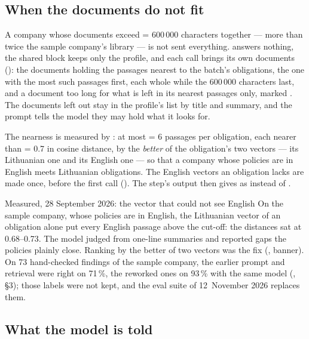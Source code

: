 \subsection{When the documents do not fit}

A company whose documents exceed  = 600\,000 characters together ---
more than twice the sample company's library --- is not sent everything. 
answers nothing, the shared block keeps only the profile, and each call brings its own
documents (): the documents holding the passages nearest to the
batch's obligations, the one with the most such passages first, each whole while the
600\,000 characters last, and a document too long for what is left in its nearest passages
only, marked . The documents left out stay in the profile's list by title
and summary, and the prompt tells the model they may hold what it looks for.

The nearness is measured by : at most  = 6
passages per obligation, each nearer than  = 0.7 in cosine
distance, by the \emph{better} of the obligation's two vectors --- its Lithuanian one and its
English one --- so that a company whose policies are in English meets Lithuanian obligations.
The English vectors an obligation lacks are made once, before the first call
(). The step's output then gives  as  instead of
.

\begin{lessonbox}{Measured, 28 September 2026: the vector that could not see English}
On the sample company, whose policies are in English, the Lithuanian vector of an obligation
alone put every English passage above the cut-off: the distances sat at 0.68--0.73. The model
judged from one-line summaries and reported gaps the policies plainly close. Ranking by the
better of two vectors was the fix (, banner). On 73 hand-checked
findings of the sample company, the earlier prompt and retrieval were right on 71\,\%, the
reworked ones on 93\,\% with the same model (, §3); those labels
were not kept, and the eval suite of 12~November 2026 replaces them.
\end{lessonbox}

\subsection{What the model is told}

